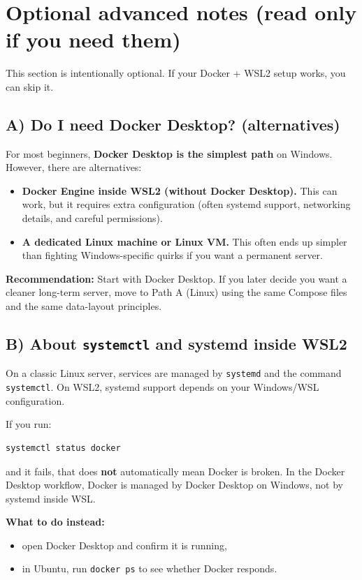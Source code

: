 
\section{Optional advanced notes (read only if you need them)}
This section is intentionally optional. If your Docker + WSL2 setup works, you can skip it.

\subsection{A) Do I need Docker Desktop? (alternatives)}
For most beginners, \textbf{Docker Desktop is the simplest path} on Windows.
However, there are alternatives:

\begin{itemize}[leftmargin=*]
  \item \textbf{Docker Engine inside WSL2 (without Docker Desktop).}
  This can work, but it requires extra configuration (often systemd support, networking details, and careful permissions).
  \item \textbf{A dedicated Linux machine or Linux VM.}
  This often ends up simpler than fighting Windows-specific quirks if you want a permanent server.
\end{itemize}

\textbf{Recommendation:} Start with Docker Desktop. If you later decide you want a cleaner long-term server,
move to Path A (Linux) using the same Compose files and the same data-layout principles.

\subsection{B) About \texttt{systemctl} and systemd inside WSL2}
On a classic Linux server, services are managed by \texttt{systemd} and the command \texttt{systemctl}.
On WSL2, systemd support depends on your Windows/WSL configuration.

If you run:
\begin{lstlisting}
systemctl status docker
\end{lstlisting}
and it fails, that does \textbf{not} automatically mean Docker is broken.
In the Docker Desktop workflow, Docker is managed by Docker Desktop on Windows, not by systemd inside WSL.

\textbf{What to do instead:}
\begin{itemize}[leftmargin=*]
  \item open Docker Desktop and confirm it is running,
  \item in Ubuntu, run \texttt{docker ps} to see whether Docker responds.
\end{itemize}

